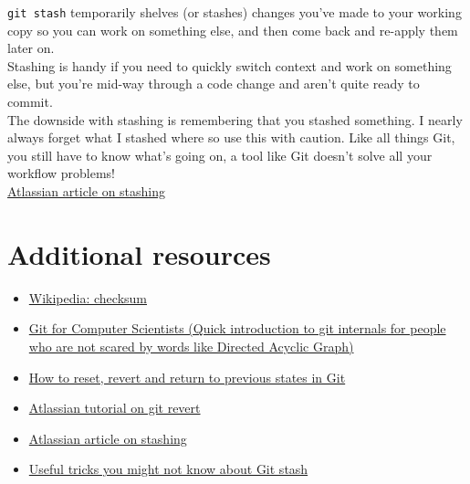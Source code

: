 \texttt{git stash} temporarily shelves (or stashes) changes you've made to your working copy so you can work on something else, and then come back and re-apply them later on. 
\\

Stashing is handy if you need to quickly switch context and work on something else, but you're mid-way through a code change and aren't quite ready to commit.
\\

The downside with stashing is remembering that you stashed something. I nearly always forget what I stashed where so use this with caution. Like all things Git, you still have to know what's going on, a tool like Git doesn't solve all your workflow problems!
\\

\href{https://www.atlassian.com/git/tutorials/saving-changes/git-stash}{Atlassian article on stashing}

\section{Additional resources}

\begin{itemize}[leftmargin=*]
    \item \href{https://en.wikipedia.org/wiki/Checksum}{Wikipedia: checksum}
	\item \href{https://eagain.net/articles/git-for-computer-scientists/}{Git for Computer Scientists (Quick introduction to git internals for people who are not scared by words like Directed Acyclic Graph)}
	\item \href{https://opensource.com/article/18/6/git-reset-revert-rebase-commands}{How to reset, revert and return to previous states in Git}
	\item \href{https://www.atlassian.com/git/tutorials/undoing-changes/git-reset}{Atlassian tutorial on git revert}
	\item \href{https://www.atlassian.com/git/tutorials/saving-changes/git-stash}{Atlassian article on stashing}
	\item \href{https://dev.to/srebalaji/useful-tricks-you-might-not-know-about-git-stash-117e}{Useful tricks you might not know about Git stash}
\end{itemize}


